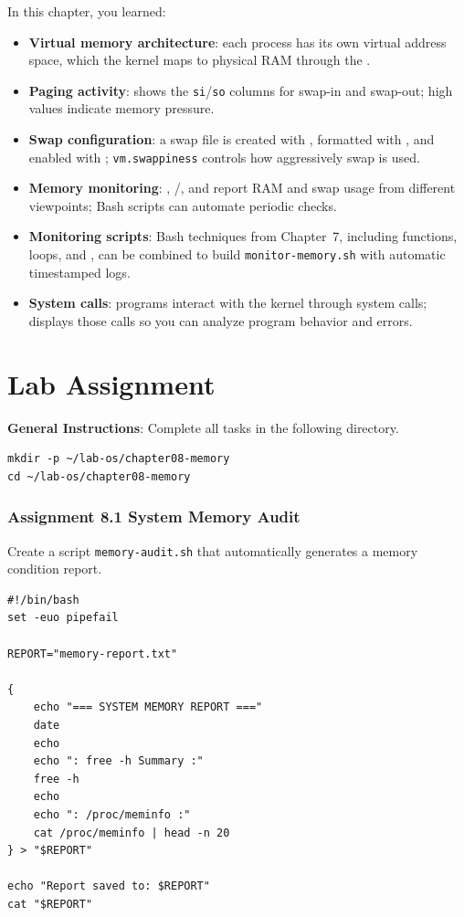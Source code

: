 In this chapter, you learned:

\begin{itemize}
    \item \textbf{Virtual memory architecture}: each process has its own virtual address space, which the kernel maps to physical RAM through the .
    \item \textbf{Paging activity}:  shows the \texttt{si}/\texttt{so} columns for swap-in and swap-out; high values indicate memory pressure.
    \item \textbf{Swap configuration}: a swap file is created with , formatted with , and enabled with ; \texttt{vm.swappiness} controls how aggressively swap is used.
    \item \textbf{Memory monitoring}: , /, and  report RAM and swap usage from different viewpoints; Bash scripts can automate periodic checks.
    \item \textbf{Monitoring scripts}: Bash techniques from Chapter~7, including functions, loops, and , can be combined to build \texttt{monitor-memory.sh} with automatic timestamped logs.
    \item \textbf{System calls}: programs interact with the kernel through system calls;  displays those calls so you can analyze program behavior and errors.
\end{itemize}

\section{Lab Assignment}

\textbf{General Instructions}: Complete all tasks in the following directory.

\begin{lstlisting}[caption={Preparing the assignment directory}]
mkdir -p ~/lab-os/chapter08-memory
cd ~/lab-os/chapter08-memory
\end{lstlisting}

\subsubsection{Assignment 8.1 System Memory Audit}

Create a script \texttt{memory-audit.sh} that automatically generates a memory
condition report.

\begin{lstlisting}[caption={Contents of memory-audit.sh}]
#!/bin/bash
set -euo pipefail

REPORT="memory-report.txt"

{
    echo "=== SYSTEM MEMORY REPORT ==="
    date
    echo
    echo ": free -h Summary :"
    free -h
    echo
    echo ": /proc/meminfo :"
    cat /proc/meminfo | head -n 20
} > "$REPORT"

echo "Report saved to: $REPORT"
cat "$REPORT"
\end{lstlisting}

